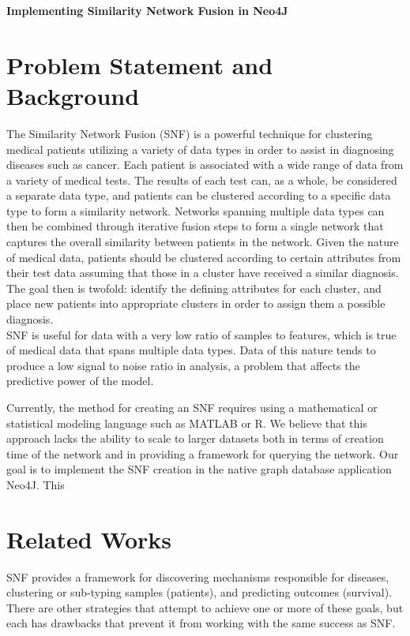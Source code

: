 \documentclass[12pt]{article}
\begin{document}
\large\center\textbf{Implementing Similarity Network Fusion in Neo4J}\\
\normalsize{}

\flushleft
\section*{Problem Statement and Background}
\quad The Similarity Network Fusion (SNF) is a powerful technique for clustering medical patients utilizing a variety of data types in order to assist in diagnosing diseases such as cancer. Each patient is associated with a wide range of data from a variety of medical tests. The results of each test can, as a whole, be considered a separate data type, and patients can be clustered according to a specific data type to form a similarity network. Networks spanning multiple data types can then be combined through iterative fusion steps to form a single network that captures the overall similarity between patients in the network. Given the nature of medical data, patients should be clustered according to certain attributes from their test data assuming that those in a cluster have received a similar diagnosis. The goal then is twofold: identify the defining attributes for each cluster, and place new patients into appropriate clusters in order to assign them a possible diagnosis.\\
\quad SNF is useful for data with a very low ratio of samples to features, which is true of medical data that spans multiple data types. Data of this nature tends to produce a low signal to noise ratio in analysis, a problem that affects the predictive power of the model.

\quad Currently, the method for creating an SNF requires using a mathematical or statistical modeling language such as MATLAB or R. We believe that this approach lacks the ability to scale to larger datasets both in terms of creation time of the network and in providing a framework for querying the network. Our goal is to implement the SNF creation in the native graph database application Neo4J. This 

\section*{Related Works}
\quad SNF provides a framework for discovering mechanisms responsible for diseases, clustering or sub-typing samples (patients), and predicting outcomes (survival). There are other strategies that attempt to achieve one or more of these goals, but each has drawbacks that prevent it from working with the same success as SNF.\\
\end{document}
